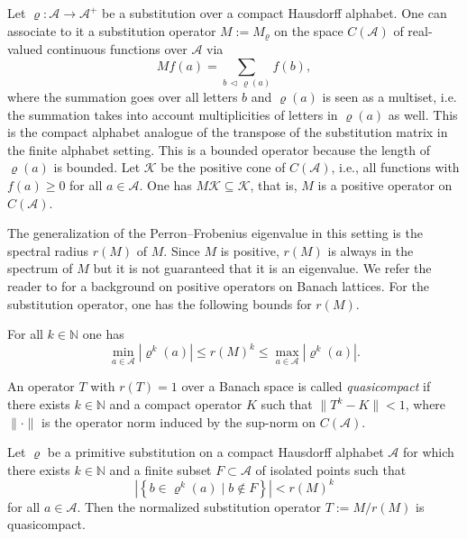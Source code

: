 Let $\varrho\colon \mathcal{A}\to \mathcal{A}^{+}$ be a substitution over a compact Hausdorff alphabet. One can associate to it a substitution operator $M:=M_{\varrho}$ on the space $C(\mathcal{A})$ of real-valued continuous functions over $\mathcal{A}$
via
\[
Mf(a)=\sum_{b\,\triangleleft\,\varrho(a)} f(b),
\]
where the summation goes over all letters $b$ and $\varrho(a)$ is seen as a multiset, i.e. the summation takes into account multiplicities of letters in $\varrho(a)$ as well. 
This is the compact alphabet analogue of the transpose of the substitution matrix in the finite alphabet setting. This is a bounded operator because the length of $\varrho(a)$ is bounded. 
Let $\mathcal{K}$ be the positive cone of $C(\mathcal{A})$, i.e., all functions with $f(a)\geqslant 0$ for all $a\in\mathcal{A}$. One has $M\mathcal {K}\subseteq \mathcal{K}$, that is, $M$ is a positive operator on $C(\mathcal{A})$. 

The generalization of the Perron--Frobenius eigenvalue in this setting is the spectral radius $r(M)$ of $M$. Since $M$ is positive, $r(M)$ is always in the spectrum of $M$ but it is not guaranteed that it is an eigenvalue.
We refer the reader to \cite{Sch} for a background on positive operators on Banach lattices. 
 For the substitution operator, one has the following bounds for $r(M)$. 

\begin{lem}\label{lem:spec-rad}
For all $k\in\mathbb{N}$ one has
\[
\min_{a\in\mathcal{A}} |\varrho^{k}(a)|\leqslant r(M)^{k}\leqslant \max_{a\in\mathcal{A}} |\varrho^{k}(a)|. 
\]
\end{lem}

An operator $T$ with $r(T)=1$ over a Banach space  is called \emph{quasicompact} if there exists $k\in\mathbb{N}$ and a compact operator $K$ such that $\|T^k-K\|<1$, where $\| \cdot \|$ is the operator norm induced by the sup-norm on $C(\mathcal{A})$.

\begin{prop} \label{prop:quasicompact}
Let $\varrho$ be a primitive substitution on a compact Hausdorff alphabet $\mathcal{A}$ for which there exists $k\in\mathbb{N}$ and a finite subset $F\subset \mathcal{A}$ of isolated points such that
\[
\left|\left\{b\in\varrho^{k}(a)\mid b\notin F\right\}\right|<r(M)^k
\]
for all $a\in\mathcal{A}$. Then the normalized substitution operator $T:=M/r(M)$ is quasicompact. 
\end{prop}

